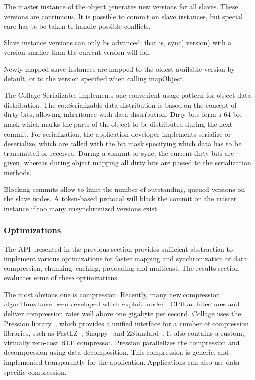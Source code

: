 \begin{compactitem}
\item The master instance of the object generates new versions for all
  slaves. These versions are continuous. It is possible to commit on slave
  instances, but special care has to be taken to handle possible
  conflicts.
\item Slave instance versions can only be advanced; that is, \textsf{sync(
  version)} with a version smaller than the current version will fail.
\item Newly mapped slave instances are mapped to the oldest available
  version by default, or to the version specified when calling
  \textsf{mapObject}.
\end{compactitem}

\label{sec:Serializable}The \textsf{Collage} Serializable implements one
convenient usage pattern for object data distribution. The
\textsf{co::Serializable} data distribution is based on the concept of dirty
bits, allowing inheritance with data distribution. Dirty bits form a 64-bit mask
which marks the parts of the object to be distributed during the next commit.
For serialization, the application developer implements \textsf{serialize} or
\textsf{deserialize}, which are called with the bit mask specifying which data
has to be transmitted or received. During a commit or sync, the current dirty
bits are given, whereas during object mapping all dirty bits are passed to the
serialization methods.

Blocking commits allow to limit the number of outstanding, queued versions on
the slave nodes. A token-based protocol will block the commit on the master
instance if too many unsynchronized versions exist.

\subsubsection{Optimizations}

The API presented in the previous section provides sufficient abstraction to
implement various optimizations for faster mapping and synchronization of data:
compression, chunking, caching, preloading and multicast. The results section
evaluates some of these optimizations.

The most obvious one is compression. Recently, many new compression algorithms
have been developed which exploit modern CPU architectures and deliver
compression rates well above one gigabyte per second. \textsf{Collage} uses the
Pression library~\cite{pression}, which provides a unified interface for a
number of compression libraries, such as FastLZ~\cite{jesperfast},
Snappy~\cite{snappy} and ZStandard~\cite{zstd}. It also contains a custom,
virtually zero-cost RLE compressor. Pression parallelizes the compression and
decompression using data decomposition. This compression is generic, and
implemented transparently for the application. Applications can also use
data-specific compression.

